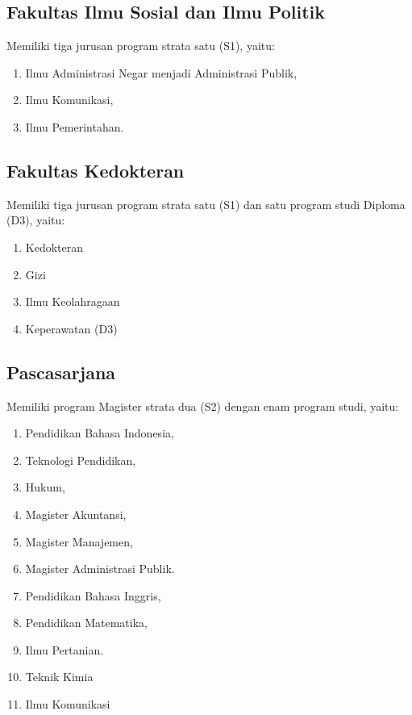 \documentclass[
]{book}
\providecommand{\tightlist}{%
  \setlength{\itemsep}{0pt}\setlength{\parskip}{0pt}}
\begin{document}
\hypertarget{fakultas-ilmu-sosial-dan-ilmu-politik}{%
\subsection{Fakultas Ilmu Sosial dan Ilmu Politik}\label{fakultas-ilmu-sosial-dan-ilmu-politik}}

Memiliki tiga jurusan program strata satu (S1), yaitu:

\begin{enumerate}
\def\labelenumi{\arabic{enumi}.}
\tightlist
\item
  Ilmu Administrasi Negar menjadi Administrasi Publik,\\
\item
  Ilmu Komunikasi,
\item
  Ilmu Pemerintahan.
\end{enumerate}

\hypertarget{fakultas-kedokteran}{%
\subsection{Fakultas Kedokteran}\label{fakultas-kedokteran}}

Memiliki tiga jurusan program strata satu (S1) dan satu program studi Diploma (D3), yaitu:

\begin{enumerate}
\def\labelenumi{\arabic{enumi}.}
\tightlist
\item
  Kedokteran
\item
  Gizi
\item
  Ilmu Keolahragaan
\item
  Keperawatan (D3)
\end{enumerate}

\hypertarget{pascasarjana}{%
\subsection{Pascasarjana}\label{pascasarjana}}

Memiliki program Magister strata dua (S2) dengan enam program studi, yaitu:

\begin{enumerate}
\def\labelenumi{\arabic{enumi}.}
\tightlist
\item
  Pendidikan Bahasa Indonesia,
\item
  Teknologi Pendidikan,
\item
  Hukum,
\item
  Magister Akuntansi,
\item
  Magister Manajemen,
\item
  Magister Administrasi Publik.
\item
  Pendidikan Bahasa Inggris,
\item
  Pendidikan Matematika,
\item
  Ilmu Pertanian.
\item
  Teknik Kimia
\item
  Ilmu Komunikasi
\end{enumerate}
\end{document}
